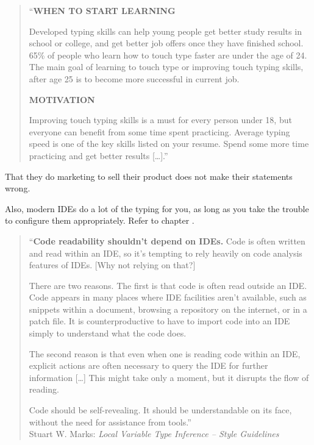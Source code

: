 \begin{quote}
\begin{samepage}
``\textbf{WHEN TO START LEARNING}

Developed typing skills can help young people get better study results in school or college, and get better job offers once they have finished school. 65\% of people who learn how to touch type faster are under the age of 24. The main goal of learning to touch type or improving touch typing skills, after age 25 is to become more successful in current job.
\end{samepage}

\begin{samepage}
\textbf{MOTIVATION}

Improving touch typing skills is a must for every person under 18, but everyone can benefit from some time spent practicing. Average typing speed is one of the key skills listed on your resume. Spend some more time practicing and get better results […].''
\end{samepage}
\end{quote}

That they do marketing to sell their product does not make their statements wrong.

Also, modern IDEs do a lot of the typing for you, as long as you take the trouble to configure them appropriately. Refer to chapter .

\begin{quote}
``\textbf{Code readability shouldn't depend on IDEs.}
Code is often written and read within an IDE, so it's tempting to rely heavily on code analysis features of IDEs. [Why not relying on that?]

There are two reasons. The first is that code is often read outside an IDE. Code appears in many places where IDE facilities aren’t available, such as snippets within a document, browsing a repository on the internet, or in a patch file. It is counterproductive to have to import code into an IDE simply to understand what the code does.

The second reason is that even when one is reading code within an IDE, explicit actions are often necessary to query the IDE for further information […] This might take only a moment, but it disrupts the flow of reading.

Code should be self-revealing. It should be understandable on its face, without the need for assistance from tools.'' \\
Stuart W. Marks: \textit{Local Variable Type Inference – Style Guidelines} \autocite{Marks:LocalVariableTypeInference:NoIDEDependency}
\end{quote}

